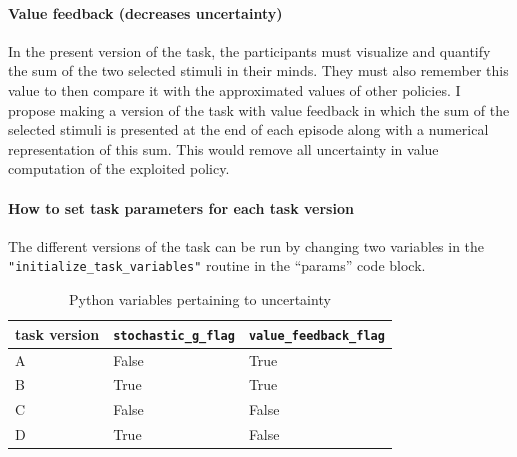 \documentclass[11pt]{article}
\begin{document}
\paragraph{Value feedback (decreases uncertainty)}
\label{sec:org25a5d67}
In the present version of the task, the participants must visualize and quantify the sum of the two selected stimuli in their minds. They must also remember this value to then compare it with the approximated values of other policies. I propose making a version of the task with value feedback in which the sum of the selected stimuli is presented at the end of each episode along with a numerical representation of this sum. This would remove all uncertainty in value computation of the exploited policy.
\paragraph{How to set task parameters for each task version}
\label{sec:orgdc51b76}
The different versions of the task can be run by changing two variables in the \texttt{"initialize\_task\_variables"} routine in the ``params'' code block.

\begin{table}[htbp]
\caption{\label{task_version_variables}Python variables pertaining to uncertainty}
\centering
\begin{tabular}{lll}
task version & \texttt{stochastic\_g\_flag} & \texttt{value\_feedback\_flag}\\
\hline
A & False & True\\
B & True & True\\
C & False & False\\
D & True & False\\
\end{tabular}
\end{table}
\end{document}
